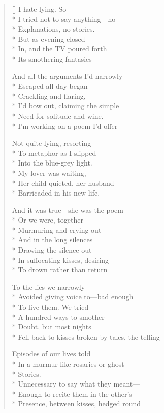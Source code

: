 \begin{verse}[\versewidth]
I hate lying. So\\*
I tried not to say anything---no\\*
Explanations, no stories. \\*
But as evening closed\\*
In, and the TV poured forth\\*
Its smothering fantasies

And all the arguments I'd narrowly\\*
Escaped all day began\\*
Crackling and flaring,\\*
I'd bow out, claiming the simple\\*
Need for solitude and wine.\\*
I'm working on a poem I'd offer

Not quite lying, resorting\\*
To metaphor as I slipped\\*
Into the blue-grey light.\\*
My lover was waiting, \\*
Her child quieted, her husband\\*
Barricaded in his new life.

And it was true---she was the poem---\\*
Or we were, together\\*
Murmuring and crying out\\*
And in the long silences\\*
Drawing the silence out\\*
In suffocating kisses, desiring\\*
To drown rather than return


To the lies we narrowly\\*
Avoided giving voice to---bad enough\\*
To live them. We tried\\*
A hundred ways to smother\\*
Doubt, but most nights\\*
Fell back to kisses broken by tales, the telling

Episodes of our lives told\\*
In a murmur like rosaries or ghost\\*
Stories. \\*
                 Unnecessary to say what they meant---\\*
Enough to recite them in the other's\\*
Presence, between kisses, hedged round


\end{verse}
